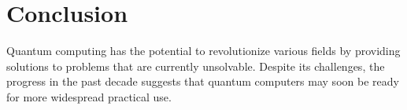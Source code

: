 

\section{Conclusion}

Quantum computing has the potential to revolutionize various fields by providing solutions to problems that
are currently unsolvable. Despite its challenges, the progress in the past decade suggests that quantum computers
may soon be ready for more widespread practical use.
